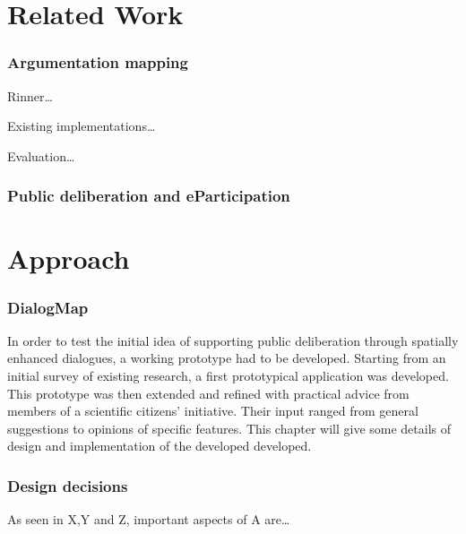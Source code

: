 \documentclass{sigchi}
\begin{document}
\section{Related Work}

\subsubsection{Argumentation mapping}
Rinner\cite{Rinner_ArgumentationMaps}\dots

Existing implementations\dots

Evaluation\dots
\subsubsection{Public deliberation and eParticipation}


\section{Approach}



\subsubsection{DialogMap}

In order to test the initial idea of supporting public deliberation through spatially enhanced dialogues, a working prototype had to be developed. Starting from an initial survey of existing research, a first prototypical application was developed. This prototype was then extended and refined with practical advice from members of a scientific citizens' initiative. Their input ranged from general suggestions to opinions of specific features. This chapter will give some details of design and implementation of the developed developed.


\subsubsection{Design decisions} %

As seen in X,Y and Z, important aspects of A are\dots
\end{document}
